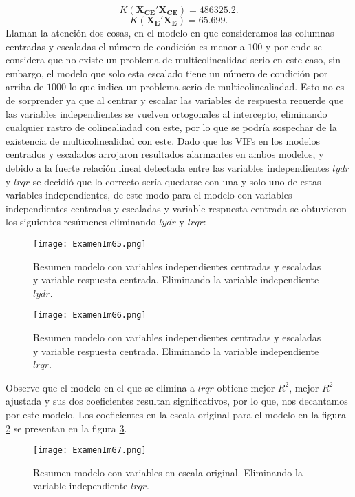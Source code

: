\documentclass[10.5pt,notitlepage]{article}
\theoremstyle{plain}
\begin{document}
\begin{equation}\label{fig3}
K(\mathbf{X_{CE}}' \mathbf{X_{CE}}) = 486325.2. 
\end{equation}
\begin{equation}\label{fig4}    K(\mathbf{X_{E}}' \mathbf{X_{E}}) =65.699.
\end{equation}
Llaman la atención dos cosas, en el modelo en que consideramos las columnas centradas y escaladas el número de condición es menor a \(100\) y por ende se considera que no existe un problema de multicolinealidad serio en este caso, sin embargo, el modelo que solo esta escalado tiene un número de condición por arriba de \(1000\) lo que indica un problema serio de multicolinealiadad. Esto no es de sorprender ya que al centrar y escalar las variables de respuesta recuerde que las variables independientes se vuelven ortogonales al intercepto, eliminando cualquier rastro de colinealiadad con este, por lo que se podría sospechar de la existencia de multicolinealidad con este. Dado que los VIFs en los modelos centrados y escalados arrojaron resultados alarmantes en ambos modelos, y debido a la fuerte relación lineal detectada entre las variables independientes \(lydr\) y \(lrqr\) se decidió que lo correcto sería quedarse con una y solo uno de estas variables independientes, de este modo para el modelo con variables independientes centradas y escaladas y variable respuesta centrada se obtuvieron los siguientes  resúmenes eliminando \(lydr\) y \(lrqr\): 
\begin{figure}[H]
 \centering
 \texttt{[image: ExamenImG5.png]}
 \caption{Resumen modelo con variables independientes centradas y escaladas y variable respuesta centrada. Eliminando la variable independiente \(lydr\).}
\label{fig5}

\end{figure}
\begin{figure}[H]
 \centering
 \texttt{[image: ExamenImG6.png]}
 \caption{Resumen modelo con variables independientes centradas y escaladas y variable respuesta centrada. Eliminando la variable independiente \(lrqr\).}
\label{fig6}
\end{figure}
Observe que el modelo en el que se elimina a \(lrqr\) obtiene mejor \(R^2\), mejor \(R^2\) ajustada y sus dos coeficientes resultan significativos, por lo que, nos decantamos por este modelo. Los coeficientes en la escala original para el modelo en la figura \ref{fig6} se presentan en la figura \ref{fig7}.
\begin{figure}[htb]
 \centering
 \texttt{[image: ExamenImG7.png]}
 \caption{Resumen modelo con variables en escala original. Eliminando la variable independiente \(lrqr\).}
\label{fig7}
\end{figure}
\end{document}
